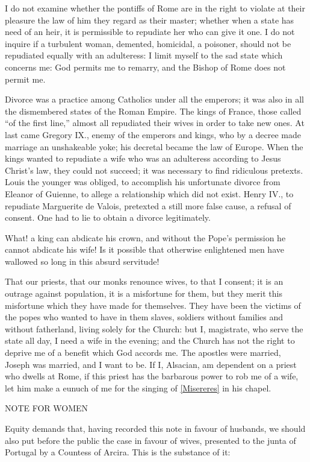 I do not examine whether the pontiffs of Rome are in the right to
violate at their pleasure the law of him they regard as their master;
whether when a state has need of an heir, it is permissible to repudiate
her who can give it one. I do not inquire if a turbulent woman,
demented, homicidal, a poisoner, should not be repudiated equally with
an adulteress: I limit myself to the sad state which concerns me: God
permits me to remarry, and the Bishop of Rome does not permit me.

Divorce was a practice among Catholics under all the emperors; it was
also in all the dismembered states of the Roman Empire. The kings of
France, those called \enquote{of the first line,} almost all repudiated their
wives in order to take new ones. At last came Gregory IX., enemy of the
emperors and kings, who by a decree made marriage an unshakeable yoke;
his decretal became the law of Europe. When the kings wanted to
repudiate a wife who was an adulteress according to Jesus Christ's law,
they could not succeed; it was necessary to find ridiculous pretexts.
Louis the younger was obliged, to accomplish his unfortunate divorce
from Eleanor of Guienne, to allege a relationship which did not exist.
Henry IV., to repudiate Marguerite de Valois, pretexted a still more
false cause, a refusal of consent. One had to lie to obtain a divorce
legitimately.

What! a king can abdicate his crown, and without the Pope's permission
he cannot abdicate his wife! Is it possible that otherwise enlightened
men have wallowed so long in this absurd servitude!

That our priests, that our monks renounce wives, to that I consent; it
is an outrage against population, it is a misfortune for them, but they
merit this misfortune which they have made for themselves. They have
been the victims of the popes who wanted to have in them slaves,
soldiers without families and without fatherland, living solely for the
Church: but I, magistrate, who serve the state all day, I need a wife in
the evening; and the Church has not the right to deprive me of a benefit
which God accords me. The apostles were married, Joseph was married, and
I want to be. If I, Alsacian, am dependent on a priest who dwells at
Rome, if this priest has the barbarous power to rob me of a wife, let
him make a eunuch of me for the singing of \vref{Misereres} in his chapel.

\noindent
NOTE FOR WOMEN

Equity demands that, having recorded this note in favour of husbands, we
should also put before the public the case in favour of wives, presented
to the junta of Portugal by a Countess of Arcira. This is the substance
of it:

